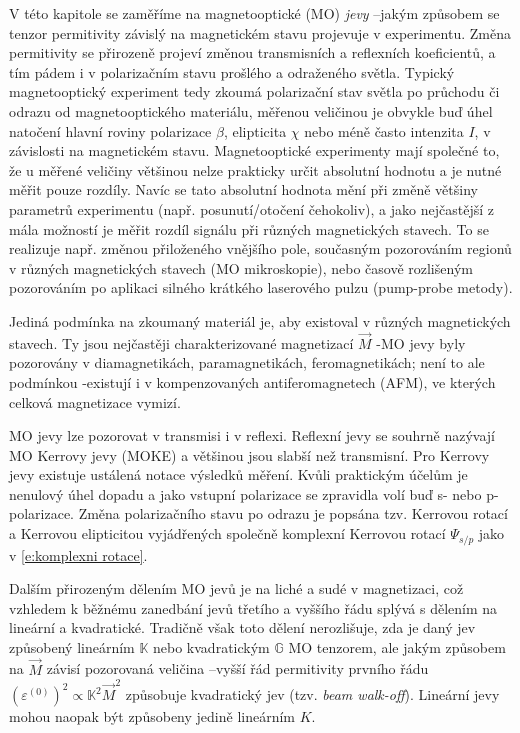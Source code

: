 V této kapitole se zaměříme na magnetooptické (MO) \emph{jevy} --\tododash jakým způsobem se tenzor permitivity závislý na magnetickém stavu projevuje v experimentu.
Změna permitivity se přirozeně projeví změnou transmisních a reflexních koeficientů, a tím pádem i v polarizačním stavu prošlého a odraženého světla.
Typický magnetooptický experiment tedy zkoumá polarizační stav světla po průchodu či odrazu od magnetooptického materiálu, měřenou veličinou je obvykle buď úhel natočení hlavní roviny polarizace $\beta$, elipticita $\chi$ nebo méně často intenzita $I$, v závislosti na magnetickém stavu.
Magnetooptické experimenty mají společné to, že u měřené veličiny většinou nelze prakticky určit absolutní hodnotu a je nutné měřit pouze rozdíly.
Navíc se tato absolutní hodnota mění při změně většiny parametrů experimentu (např. posunutí/otočení čehokoliv), a jako nejčastější z mála možností je měřit rozdíl signálu při různých magnetických stavech.
To se realizuje např. změnou přiloženého vnějšího pole, současným pozorováním regionů v různých magnetických stavech (MO mikroskopie), nebo časově rozlišeným pozorováním po aplikaci silného krátkého laserového pulzu (pump-probe metody).

Jediná podmínka na zkoumaný materiál je, aby existoval v různých magnetických stavech.
Ty jsou nejčastěji charakterizované magnetizací $\vec{M}$ -\tododash MO jevy byly pozorovány v diamagnetikách, paramagnetikách, feromagnetikách;
není to ale podmínkou -\tododash existují i v kompenzovaných antiferomagnetech (AFM), ve kterých celková magnetizace vymizí.

MO jevy lze pozorovat v transmisi i v reflexi.
Reflexní jevy se souhrně nazývají MO Kerrovy jevy (MOKE) a většinou jsou slabší než transmisní.
Pro Kerrovy jevy existuje ustálená notace výsledků měření.
Kvůli praktickým účelům je nenulový úhel dopadu a jako vstupní polarizace se zpravidla volí buď s- nebo p-polarizace. Změna polarizačního stavu po odrazu je popsána tzv. Kerrovou rotací a Kerrovou elipticitou vyjádřených společně komplexní Kerrovou rotací $\Psi_{s/p}$ jako v \eqref{e:komplexni rotace}.

Dalším přirozeným dělením MO jevů je na liché a sudé v magnetizaci, což vzhledem k běžnému zanedbání jevů třetího a vyššího řádu splývá s dělením na lineární a kvadratické.
Tradičně však toto dělení nerozlišuje, zda je daný jev způsobený lineárním  $\mathbb{K}$ nebo kvadratickým $\mathbb{G}$ MO tenzorem, ale jakým způsobem na $\vec{M}$ závisí pozorovaná veličina --\tododash vyšší řád permitivity prvního řádu $\left(\varepsilon^{(0)}\right)^2 \propto \mathbb{K}^2 \vec{M}^2$ způsobuje kvadratický jev (tzv. \emph{beam walk-off}).
Lineární jevy mohou naopak být způsobeny jedině lineárním $K$.


